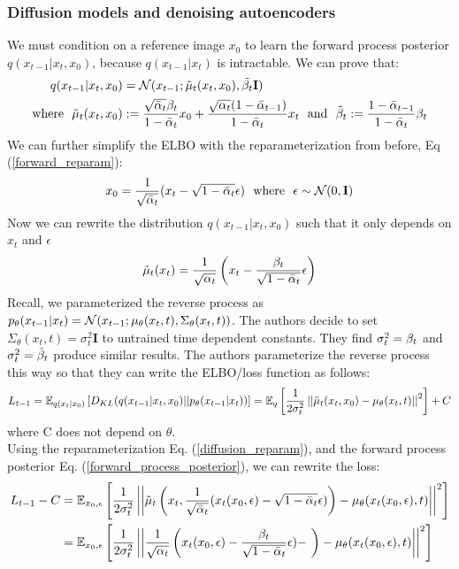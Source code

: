 \documentclass{article}
\begin{document}
\subsubsection{Diffusion models and denoising autoencoders}
We must condition on a reference image $x_0$ to learn the forward process posterior $q(x_{t-1}|x_t,x_0)$, because $q(x_{t-1}|x_t)$ is intractable. We can prove that:
\begin{align}
    q(x_{t-1}|x_t,x_0) &= \mathcal{N}(x_{t-1};\Tilde{\mu}_t(x_t,x_0),\Tilde{\beta_{t}} \mathbf{I})\\
    \text{where~~} \Tilde{\mu}_t(x_t,x_0) &:= \frac{\sqrt{\bar{\alpha}_t}\beta_{t}}{1-\bar{\alpha}_t}x_0 + \frac{\sqrt{\alpha_t}(1-\bar{\alpha}_{t-1})}{1-\bar{\alpha}_t}x_t \text{~~and~~} \Tilde{\beta}_t := \frac{1-\bar{\alpha}_{t-1}}{1-\bar{\alpha}_t}\beta_{t} \label{forward_process_posterior}
\end{align}
We can further simplify the ELBO with the reparameterization from before, Eq (\ref{forward_reparam}):
\begin{align}
    x_0 = \frac{1}{\sqrt{\bar{\alpha}_t}}(x_t - \sqrt{1-\bar{\alpha}_t}\epsilon) \text{~~where~~} \epsilon \sim \mathcal{N}(0,\mathbf{I}) \label{diffusion_reparam}
\end{align}
Now we can rewrite the distribution $q(x_{t-1}|x_t,x_0)$ such that it only depends on $x_t$ and $\epsilon$
\begin{align}
    \Tilde{\mu}_t(x_t) = \frac{1}{\sqrt{\alpha_t}} \left( x_t - \frac{\beta_{t}}{\sqrt{1 - \bar{\alpha}_t}}\epsilon \right) \label{forward_process_posterior_mean}
\end{align}
Recall, we parameterized the reverse process as $p_\theta(x_{t-1}|x_t) = \mathcal{N}(x_{t-1};\mu_\theta(x_t,t), \Sigma_\theta(x_t,t))$. The authors decide to set $\Sigma_\theta(x_t,t) = \sigma_t^2\mathbf{I}$ to untrained time dependent constants. They find $\sigma_t^2=\beta_{t}$ and $\sigma_t^2=\Tilde{\beta}_t$ produce similar results. The authors parameterize the reverse process this way so that they can write the ELBO/loss function as follows:
\begin{align}
    L_{t-1} = \mathbb{E}_{q(x_t|x_0)}\left[D_{KL}(q(x_{t-1}|x_t,x_0)||p_\theta(x_{t-1}|x_t))\right] = \mathbb{E}_q\left[ \frac{1}{2\sigma^2_t}\left|\left| \Tilde{\mu}_t(x_t,x_0) - \mu_\theta(x_t,t) \right|\right|^2 \right] + C
\end{align}
where C does not depend on $\theta$. \\
Using the reparameterization Eq. (\ref{diffusion_reparam}), and the forward process posterior Eq. (\ref{forward_process_posterior}), we can rewrite the loss:
\begin{align}
    L_{t-1} - C &= \mathbb{E}_{x_0,\epsilon}\left[ \frac{1}{2\sigma^2_t}\left|\left| \Tilde{\mu}_t \left( x_t,\frac{1}{\sqrt{\bar{\alpha}_t}}(x_t(x_0,\epsilon) - \sqrt{1-\bar{\alpha}_t}\epsilon) \right) - \mu_\theta(x_t(x_0,\epsilon),t) \right|\right|^2 \right] \\
    &= \mathbb{E}_{x_0,\epsilon}\left[ \frac{1}{2\sigma^2_t}\left|\left| \frac{1}{\sqrt{\alpha_t}}\left( x_t(x_0,\epsilon) - \frac{\beta_{t}}{\sqrt{1-\bar{\alpha}_t}}\epsilon) - \ \right) - \mu_\theta(x_t(x_0,\epsilon),t) \right|\right|^2 \right]
\end{align}
\end{document}
